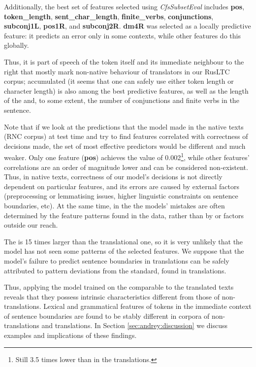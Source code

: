 \documentclass[output=paper]{langsci/langscibook.cls}
\begin{document}
Additionally, the best set of features selected using \textit{CfsSubsetEval} includes \textbf{pos}, \textbf{token\_length}, \textbf{sent\_char\_length}, \textbf{finite\_verbs}, \textbf{conjunctions}, \textbf{subconj1L}, \textbf{pos1R}, and \textbf{subconj2R}. \textbf{dm4R} was selected as a locally predictive feature: it predicts an error only in some contexts, while other features do this globally.

Thus, it is part of speech of the token itself and its immediate neighbour to the right that mostly mark non-native behaviour of  translators in our RusLTC corpus; accumulated  (it seems that one can safely use either token length or character length) is also among the best predictive features, as well as the length of the  and, to some extent, the number of conjunctions and finite verbs in the sentence.

Note that if we look at the predictions that the model made in the native texts (RNC corpus) at test time and try to find features correlated with correctness of decisions made, the set of most effective predictors would be different and much weaker. Only one feature (\textbf{pos}) achieves the  value of 0.002\footnote{Still 3.5 times lower than in the translations.}, while other features' correlations are an order of magnitude lower and can be considered non-existent. Thus, in native texts, correctness of our model's decisions is not directly dependent on particular features, and its errors are caused by external factors (preprocessing or lemmatising issues, higher linguistic constraints on sentence boundaries, etc). At the same time, in the  the models' mistakes are often determined by the feature patterns found in the data, rather than by  or factors outside our reach. 

The  is 15 times larger than the translational one, so it is very unlikely that the model has not seen some patterns of the selected features. We suppose that the model's failure to predict sentence boundaries in translations can be safely attributed to  pattern deviations from the standard, found in translations.

Thus, applying the model trained on the comparable  to the translated texts reveals that they possess intrinsic characteristics different from those of non-translations. Lexical and grammatical features of tokens in the immediate context of sentence boundaries are found to be stably different in corpora of non-translations and translations. In Section \ref{sec:andrey:discussion} we discuss examples and implications of these findings.
\end{document}
